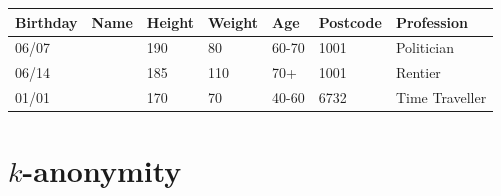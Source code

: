 \begin{frame}
  \begin{example}
    \begin{table}[H]
      \begin{tabular}{l|l|l|l|l|l|l}
        Birthday & Name & Height  & Weight & Age & Postcode & Profession\\
        \hline
        06/07 & & 190 & 80 & 60-70 & 1001 & Politician\\
        06/14 &  & 185 & 110 & 70+ & 1001 & Rentier\\
        01/01 &  & 170 & 70 & 40-60 & 6732 & Time Traveller
      \end{tabular}
    \end{table}
  \end{example}
\end{frame}



\section{$k$-anonymity}

